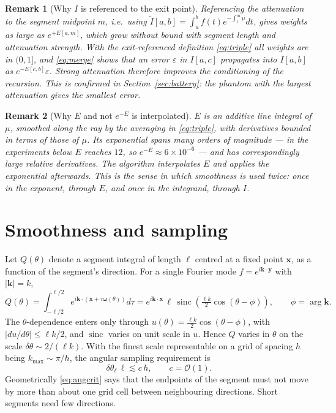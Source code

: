 \documentclass[11pt]{article}
\newtheorem{remark}{Remark}
\newcommand{\bx}{\mathbf{x}}
\newcommand{\bk}{\mathbf{k}}
\newcommand{\om}{\boldsymbol{\omega}}
\newcommand{\bigO}{\mathcal{O}}
\begin{document}
\begin{remark}[Why $I$ is referenced to the exit point]
\label{rem:reference}
Referencing the attenuation to the segment midpoint $m$, i.e.\ using
$\tilde I[a,b]=\int_a^b f(t)e^{-\int_t^m\mu}dt$, gives weights as large as
$e^{+E[a,m]}$, which grow without bound with segment length and attenuation
strength. With the exit-referenced definition \eqref{eq:triple} all weights are
in $(0,1]$, and \eqref{eq:merge} shows that an error $\varepsilon$ in $I[a,c]$
propagates into $I[a,b]$ as $e^{-E[c,b]}\varepsilon$. Strong attenuation
therefore improves the conditioning of the recursion. This is confirmed in
Section~\ref{sec:battery}: the phantom with the largest attenuation gives the
smallest error.
\end{remark}

\begin{remark}[Why $E$ and not $e^{-E}$ is interpolated]
\label{rem:exponent}
$E$ is an additive line integral of $\mu$, smoothed along the ray by the
averaging in \eqref{eq:triple}, with derivatives bounded in terms of those of
$\mu$. Its exponential spans many orders of magnitude --- in the experiments
below $E$ reaches $12$, so $e^{-E}\approx 6\times 10^{-6}$ --- and has
correspondingly large relative derivatives. The algorithm interpolates $E$ and
applies the exponential afterwards. This is the sense in which smoothness is
used twice: once in the exponent, through $E$, and once in the integrand,
through $I$.
\end{remark}

\section{Smoothness and sampling}
\label{sec:sampling}

Let $Q(\theta)$ denote a segment integral of length $\ell$ centred at a fixed
point $\bx$, as a function of the segment's direction. For a single Fourier
mode $f=e^{i\bk\cdot\mathbf{y}}$ with $|\bk|=k$,
\begin{equation}
  Q(\theta)=\int_{-\ell/2}^{\ell/2} e^{i\bk\cdot(\bx+\tau\om(\theta))}d\tau
  = e^{i\bk\cdot\bx}\,\ell\,
    \operatorname{sinc}\!\left(\tfrac{\ell k}{2}\cos(\theta-\phi)\right),
  \qquad \phi=\arg\bk .
  \label{eq:sinc}
\end{equation}
The $\theta$-dependence enters only through $u(\theta)=\frac{\ell k}{2}
\cos(\theta-\phi)$, with $|du/d\theta|\le \ell k/2$, and $\operatorname{sinc}$
varies on unit scale in $u$. Hence $Q$ varies in $\theta$ on the scale
$\delta\theta\sim 2/(\ell k)$. With the finest scale representable on a grid of
spacing $h$ being $k_{\max}\sim\pi/h$, the angular sampling requirement is
\begin{equation}
  \boxed{\;\delta\theta_\ell\,\ell \lesssim c\,h,\qquad c=\bigO(1).\;}
  \label{eq:angcrit}
\end{equation}
Geometrically \eqref{eq:angcrit} says that the endpoints of the segment must
not move by more than about one grid cell between neighbouring directions.
Short segments need few directions.
\end{document}
